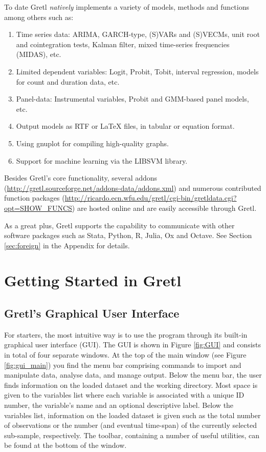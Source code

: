\documentclass[11pt]{article}
\begin{document}
To date Gretl \textit{natively} implements a variety of models, methods and functions among others such as: 
\begin{enumerate}
	\item Time series data: ARIMA, GARCH-type, (S)VARs and (S)VECMs, unit root and cointegration tests, Kalman filter, mixed time-series frequencies (MIDAS), etc.
	\item Limited dependent variables: Logit, Probit, Tobit, interval regression, models for count and duration data, etc.
	\item Panel-data: Instrumental variables, Probit and
	GMM-based panel models, etc.
	\item Output models as RTF or LaTeX files, in tabular or equation format.
	\item Using gnuplot for compiling high-quality graphs.
	\item Support for machine learning via the LIBSVM library.
\end{enumerate}
Besides Gretl's core functionality, several addons \\ (\url{http://gretl.sourceforge.net/addons-data/addons.xml}) and numerous contributed function packages (\url{http://ricardo.ecn.wfu.edu/gretl/cgi-bin/gretldata.cgi?opt=SHOW_FUNCS}) are hosted online and are easily accessible through Gretl.

As a great plus, Gretl supports the capability to communicate with other software packages such as Stata, Python, R, Julia, Ox and Octave. See Section \ref{sec:foreign} in the Appendix for details.%


\section{Getting Started in Gretl}
\subsection{Gretl's Graphical User Interface}
For starters, the most intuitive way is to use the program through its built-in graphical user interface (GUI). The GUI is shown in Figure \ref{fig:GUI} and consists in total of four separate windows. At the top of the main window (see Figure \ref{fig:gui_main}) you find the menu bar comprising commands to import and manipulate data, analyse data, and manage output. Below the menu bar, the user finds information on the loaded dataset and the working directory. Most space is given to the variables list where each variable is associated with a unique ID number, the variable's name and an optional descriptive label. Below the variables list, information on the loaded dataset is given such as the total number of observations or the number (and eventual time-span) of the currently selected sub-sample, respectively. The toolbar, containing a number of useful utilities, can be found at the bottom of the window. 
\end{document}
